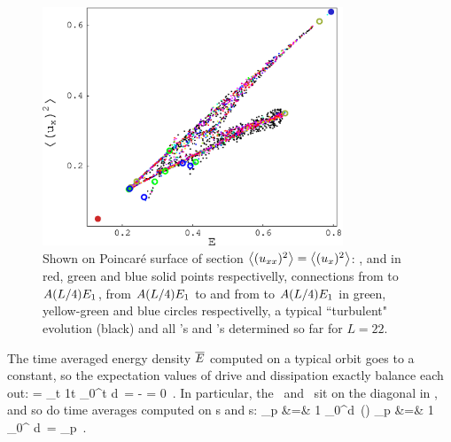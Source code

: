 \begin{figure}[t] \label{f:drivedragPoinc}
\begin{center}
	\includegraphics[width=0.8\textwidth]{figs/energyPoinc.eps}
\end{center}
\caption{ 
Shown on Poincar\'{e} surface of section $\left\langle {(u_{xx})^2} \right\rangle = \left\langle {(u_{x})^2} \right\rangle$:
,  and  in red, green and blue solid points respectivelly, 
connections from  to $A(L/4)E_{1}$, 
from $A(L/4)E_{1}$ to  and from  to $A(L/4)E_{1}$ in green, yellow-green and blue circles respectivelly,
a typical ``turbulent" evolution (black) and all \po's and \rpo's determined so far for $L=22$. 
        }
\end{figure}


The time averaged energy density  $\overline{E}$
computed on a typical orbit goes to a constant, so
the expectation values  of drive and dissipation
exactly balance each out:
\beq
	  = 
	\lim_{t\rightarrow \infty}
		{1\over t} \int_0^t d\tau \, \dot{\expctE}
=
	   - 
= 0 
	\,.
In particular, the \eqva\
and \reqva\ sit on the diagonal in ,
and so do time averages computed on \po s and \rpo s:
\bea
{}_p &=& 
{1\over {}} \int_0^d\tau \, \expctE(\tau)
	\continue
{}_p &=& 
{1\over {}} \int_0^ d\tau \,  
	=
	  _p
	\,.
\label{poE}
\eea

